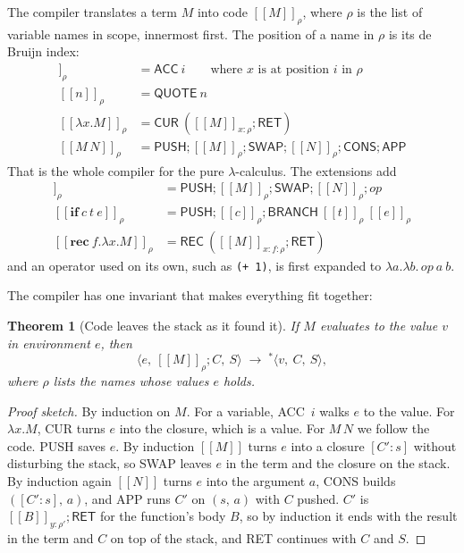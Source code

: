 \documentclass[11pt,a4paper]{article}
\newcommand{\ins}[1]{\textsf{#1}}
\newcommand{\clo}[2]{[#1 : #2]}
\newcommand{\pr}[2]{(#1,\, #2)}
\newcommand{\sem}[1]{[\![#1]\!]}
\newcommand{\trans}{\;\longrightarrow\;}
\newcommand{\cs}[3]{\langle #1,\ #2,\ #3\rangle}
\newcommand{\seq}{\mathbin{;}}
\theoremstyle{definition}
\theoremstyle{plain}
\newtheorem{theorem}{Theorem}
\begin{document}
The compiler translates a term $M$ into code $\sem{M}_\rho$, where $\rho$ is
the list of variable names in scope, innermost first. The position of a name
in $\rho$ is its de Bruijn index:
\begin{align*}
\sem{x}_\rho &= \ins{ACC}\ i \qquad\text{where $x$ is at position $i$ in $\rho$}\\
\sem{n}_\rho &= \ins{QUOTE}\ n\\
\sem{\lambda x.M}_\rho &= \ins{CUR}\ (\sem{M}_{x:\rho}\seq \ins{RET})\\
\sem{M\,N}_\rho &= \ins{PUSH}\seq \sem{M}_\rho\seq \ins{SWAP}\seq \sem{N}_\rho\seq \ins{CONS}\seq \ins{APP}
\end{align*}
That is the whole compiler for the pure $\lambda$-calculus. The extensions add
\begin{align*}
\sem{\textit{op}\ M\ N}_\rho &= \ins{PUSH}\seq \sem{M}_\rho\seq \ins{SWAP}\seq \sem{N}_\rho\seq \textit{op}\\
\sem{\textbf{if}\ c\ t\ e}_\rho &= \ins{PUSH}\seq \sem{c}_\rho\seq \ins{BRANCH}\ \sem{t}_\rho\ \sem{e}_\rho\\
\sem{\textbf{rec}\ f.\lambda x.M}_\rho &= \ins{REC}\ (\sem{M}_{x:f:\rho}\seq \ins{RET})
\end{align*}
and an operator used on its own, such as \verb|(+ 1)|, is first expanded to
$\lambda a.\lambda b.\,\textit{op}\ a\ b$.

The compiler has one invariant that makes everything fit together:

\begin{theorem}[Code leaves the stack as it found it]\label{thm:invariant}
If $M$ evaluates to the value $v$ in environment $e$, then
\[
  \cs{e}{\sem{M}_\rho\seq C}{S} \trans^{*} \cs{v}{C}{S},
\]
where $\rho$ lists the names whose values $e$ holds.
\end{theorem}

\begin{proof}[Proof sketch]
By induction on $M$. For a variable, \ins{ACC}~$i$ walks $e$ to the value. For
$\lambda x.M$, \ins{CUR} turns $e$ into the closure, which is a value. For
$M\,N$ we follow the code. \ins{PUSH} saves $e$. By induction $\sem{M}$ turns
$e$ into a closure $\clo{C'}{s}$ without disturbing the stack, so \ins{SWAP}
leaves $e$ in the term and the closure on the stack. By induction again
$\sem{N}$ turns $e$ into the argument $a$, \ins{CONS} builds
$\pr{\clo{C'}{s}}{a}$, and \ins{APP} runs $C'$ on $\pr{s}{a}$ with $C$ pushed.
$C'$ is $\sem{B}_{y:\rho'}\seq\ins{RET}$ for the function's body $B$, so by
induction it ends with the result in the term and $C$ on top of the stack,
and \ins{RET} continues with $C$ and $S$.
\end{proof}
\end{document}
